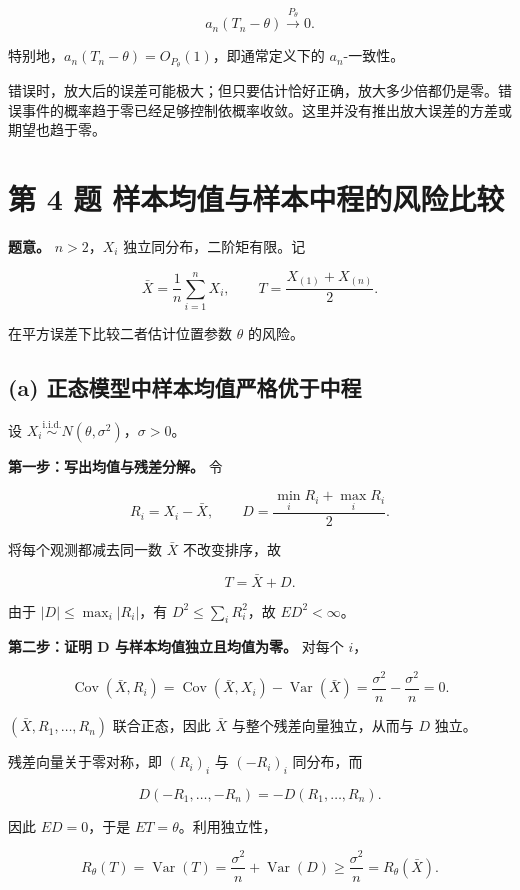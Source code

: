 \[
\boxed{a_n(T_n-\theta)\xrightarrow{P_\theta}0}.
\]

特别地，$a_n(T_n-\theta)=O_{P_\theta}(1)$，即通常定义下的 $a_n$-一致性。

 错误时，放大后的误差可能极大；但只要估计恰好正确，放大多少倍都仍是零。错误事件的概率趋于零已经足够控制依概率收敛。这里并没有推出放大误差的方差或期望也趋于零。

\section{第 4 题 样本均值与样本中程的风险比较}

\textbf{题意。} $n>2$，$X_i$ 独立同分布，二阶矩有限。记

\[
\bar X=\frac1n\sum_{i=1}^nX_i,\qquad
T=\frac{X_{(1)}+X_{(n)}}2.
\]

在平方误差下比较二者估计位置参数 $\theta$ 的风险。

\subsection{(a) 正态模型中样本均值严格优于中程}

设 $X_i\overset{\mathrm{i.i.d.}}{\sim}N(\theta,\sigma^2)$，$\sigma>0$。

\textbf{第一步：写出均值与残差分解。} 令

\[
R_i=X_i-\bar X,\qquad
D=\frac{\min_iR_i+\max_iR_i}{2}.
\]

将每个观测都减去同一数 $\bar X$ 不改变排序，故

\[
T=\bar X+D.
\]

由于 $|D|\le\max_i|R_i|$，有 $D^2\le\sum_iR_i^2$，故 $E D^2<\infty$。

\textbf{第二步：证明 D 与样本均值独立且均值为零。} 对每个 $i$，

\[
\operatorname{Cov}(\bar X,R_i)
=\operatorname{Cov}(\bar X,X_i)-\operatorname{Var}(\bar X)
=\frac{\sigma^2}{n}-\frac{\sigma^2}{n}=0.
\]

$(\bar X,R_1,\ldots,R_n)$ 联合正态，因此 $\bar X$ 与整个残差向量独立，从而与 $D$ 独立。

残差向量关于零对称，即 $(R_i)_i$ 与 $(-R_i)_i$ 同分布，而

\[
D(-R_1,\ldots,-R_n)=-D(R_1,\ldots,R_n).
\]

因此 $ED=0$，于是 $ET=\theta$。利用独立性，

\[
R_\theta(T)
=\operatorname{Var}(T)
=\frac{\sigma^2}{n}+\operatorname{Var}(D)
\ge\frac{\sigma^2}{n}
=R_\theta(\bar X).
\]

